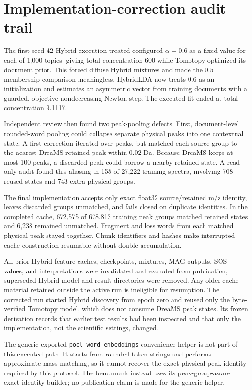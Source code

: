 \documentclass[11pt]{article}
\newcommand{\code}[1]{\texttt{#1}}
\begin{document}
\section{Implementation-correction audit trail}
\label{app:corrections}

The first seed-42 Hybrid execution treated configured $\alpha=0.6$ as a fixed
value for each of 1,000 topics, giving total concentration 600 while Tomotopy
optimized its document prior. This forced diffuse Hybrid mixtures and made the
0.5 membership comparison meaningless. HybridLDA now treats 0.6 as an
initialization and estimates an asymmetric vector from training documents with
a guarded, objective-nondecreasing Newton step. The executed fit ended at
total concentration 9.1117.

Independent review then found two peak-pooling defects. First, document-level
rounded-word pooling could collapse separate physical peaks into one contextual
state. A first correction iterated over peaks, but matched each source group to
the nearest DreaMS-retained peak within 0.02 Da. Because DreaMS keeps at most
100 peaks, a discarded peak could borrow a nearby retained state. A read-only
audit found this aliasing in 158 of 27,222 training spectra, involving 708
reused states and 743 extra physical groups.

The final implementation accepts only exact float32 source/retained m/z
identity, leaves discarded groups unmatched, and fails closed on duplicate
identities. In the completed cache, 672,575 of 678,813 training peak groups
matched retained states and 6,238 remained unmatched. Fragment and loss words
from each matched physical peak stayed together. Chunk identifiers and hashes
make interrupted cache construction resumable without double accumulation.

All prior Hybrid feature caches, checkpoints, mixtures, MAG outputs, SOS
values, and interpretations were invalidated and excluded from publication;
superseded Hybrid model and result directories were removed. Any older cache
material retained outside the active run is ineligible for resumption. The
corrected run started Hybrid discovery from epoch zero and reused only the
byte-verified Tomotopy model, which does not consume DreaMS peak states. Its
frozen derivation records that earlier test results had been inspected and that
only the implementation, not the scientific settings, changed.

The generic exported \code{pool\_word\_embeddings} convenience helper is not
part of this executed path. It starts from rounded token strings and performs
approximate mass matching, so it cannot recover the exact physical-peak
identity required by this protocol. The benchmark instead uses its
peak-group-aware exact-identity builder; no publication claim is made for the
generic helper.
\end{document}
